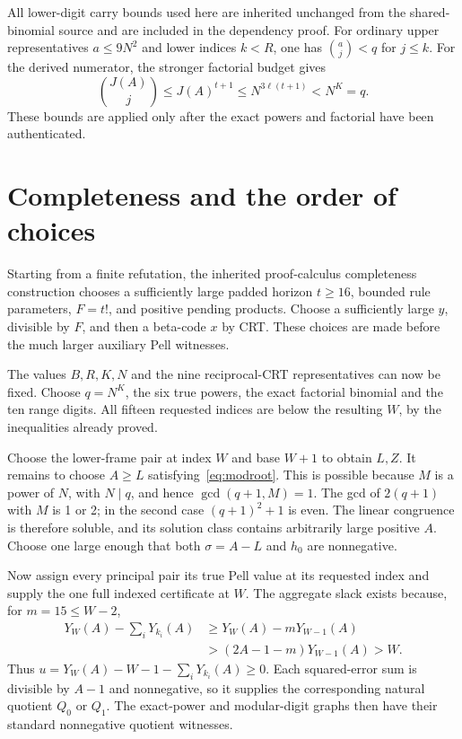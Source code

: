 \documentclass[11pt]{article}
\theoremstyle{definition}\newtheorem{definition}[theorem]{Definition}
\theoremstyle{remark}\newtheorem{remark}[theorem]{Remark}
\begin{document}
All lower-digit carry bounds used here are inherited unchanged from the shared-binomial source and are included in the dependency proof. For ordinary upper representatives $a\le9N^2$ and lower indices $k<R$, one has $\binom aj<q$ for $j\le k$. For the derived numerator, the stronger factorial budget gives
\[
 \binom{J(A)}j\le J(A)^{t+1}\le N^{3\ell(t+1)}<N^K=q.
\]
These bounds are applied only after the exact powers and factorial have been authenticated.

\section{Completeness and the order of choices}

Starting from a finite refutation, the inherited proof-calculus completeness construction chooses a sufficiently large padded horizon $t\ge16$, bounded rule parameters, $F=t!$, and positive pending products. Choose a sufficiently large $y$, divisible by $F$, and then a beta-code $x$ by CRT. These choices are made before the much larger auxiliary Pell witnesses.

The values $B,R,K,N$ and the nine reciprocal-CRT representatives can now be fixed. Choose $q=N^K$, the six true powers, the exact factorial binomial and the ten range digits. All fifteen requested indices are below the resulting $W$, by the inequalities already proved.

Choose the lower-frame pair at index $W$ and base $W+1$ to obtain $L,Z$. It remains to choose $A\ge L$ satisfying~\eqref{eq:modroot}. This is possible because $M$ is a power of $N$, with $N\mid q$, and hence $\gcd(q+1,M)=1$. The gcd of $2(q+1)$ with $M$ is 1 or 2; in the second case $(q+1)^2+1$ is even. The linear congruence is therefore soluble, and its solution class contains arbitrarily large positive $A$. Choose one large enough that both $\sigma=A-L$ and $h_0$ are nonnegative.

Now assign every principal pair its true Pell value at its requested index and supply the one full indexed certificate at $W$. The aggregate slack exists because, for $m=15\le W-2$,
\begin{align*}
 Y_W(A)-\sum_iY_{k_i}(A)
 &\ge Y_W(A)-mY_{W-1}(A)\\
 &>(2A-1-m)Y_{W-1}(A)>W.
\end{align*}
Thus $u=Y_W(A)-W-1-\sum_iY_{k_i}(A)\ge0$. Each squared-error sum is divisible by $A-1$ and nonnegative, so it supplies the corresponding natural quotient $Q_0$ or $Q_1$. The exact-power and modular-digit graphs then have their standard nonnegative quotient witnesses.
\end{document}
